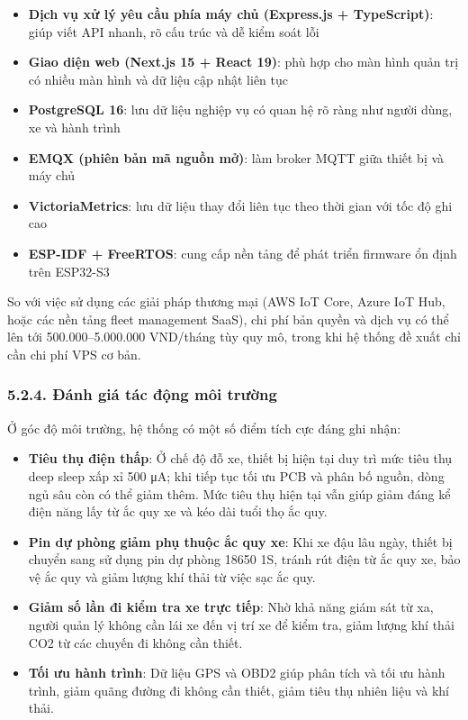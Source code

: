 \documentclass[a4paper]{extarticle}
\providecommand{\tightlist}{%
  \setlength{\itemsep}{0pt}\setlength{\parskip}{0pt}}
\begin{document}
\begin{itemize}
\tightlist
\item
  \textbf{Dịch vụ xử lý yêu cầu phía máy chủ (Express.js +
  TypeScript)}: giúp viết API nhanh, rõ cấu trúc và dễ kiểm soát lỗi
\item
  \textbf{Giao diện web (Next.js 15 + React 19)}: phù hợp cho màn hình quản trị
  có nhiều màn hình và dữ liệu cập nhật liên tục
\item
  \textbf{PostgreSQL 16}: lưu dữ liệu nghiệp vụ có quan hệ rõ ràng như
  người dùng, xe và hành trình
\item
  \textbf{EMQX (phiên bản mã nguồn mở)}: làm broker MQTT giữa thiết bị và
  máy chủ
\item
  \textbf{VictoriaMetrics}: lưu dữ liệu thay đổi liên tục theo thời gian
  với tốc độ ghi cao
\item
  \textbf{ESP-IDF + FreeRTOS}: cung cấp nền tảng để phát triển firmware
  ổn định trên ESP32-S3
\end{itemize}

So với việc sử dụng các giải pháp thương mại (AWS IoT Core, Azure IoT
Hub, hoặc các nền tảng fleet management SaaS), chi phí bản quyền và dịch
vụ có thể lên tới 500.000--5.000.000 VND/tháng tùy quy mô, trong khi hệ
thống đề xuất chỉ cần chi phí VPS cơ bản.

\subsubsection{5.2.4. Đánh giá tác động môi
trường}\label{524-ux111uxe1nh-giuxe1-tuxe1c-ux111ux1ed9ng-muxf4i-trux1b0ux1eddng}

Ở góc độ môi trường, hệ thống có một số điểm tích cực đáng ghi nhận:

\begin{itemize}
\tightlist
\item
  \textbf{Tiêu thụ điện thấp}: Ở chế độ đỗ xe, thiết bị hiện tại duy trì
  mức tiêu thụ deep sleep xấp xỉ 500 μA; khi tiếp tục tối ưu PCB và phân
  bố nguồn, dòng ngủ sâu còn có thể giảm thêm. Mức tiêu thụ hiện tại vẫn
  giúp giảm đáng kể điện năng lấy từ ắc quy xe và kéo dài tuổi thọ ắc
  quy.
\item
  \textbf{Pin dự phòng giảm phụ thuộc ắc quy xe}: Khi xe đậu lâu ngày,
  thiết bị chuyển sang sử dụng pin dự phòng 18650 1S, tránh rút điện từ
  ắc quy xe, bảo vệ ắc quy và giảm lượng khí thải từ việc sạc ắc quy.
\item
  \textbf{Giảm số lần đi kiểm tra xe trực tiếp}: Nhờ khả năng giám sát
  từ xa, người quản lý không cần lái xe đến vị trí xe để kiểm tra, giảm
  lượng khí thải CO2 từ các chuyến đi không cần thiết.
\item
  \textbf{Tối ưu hành trình}: Dữ liệu GPS và OBD2 giúp phân tích và tối
  ưu hành trình, giảm quãng đường đi không cần thiết, giảm tiêu thụ
  nhiên liệu và khí thải.
\end{itemize}
\end{document}
